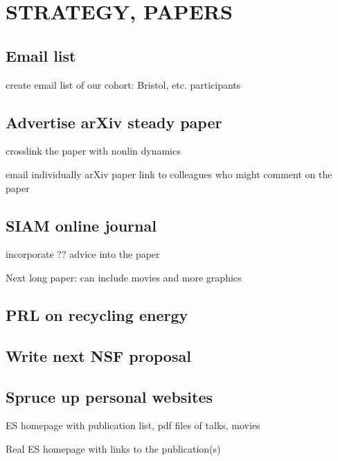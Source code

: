 
\section{STRATEGY, PAPERS}

\subsection{Email list}

create email list of our cohort:  Bristol, etc. participants

\subsection{Advertise arXiv steady paper}

crosslink the paper with nonlin dynamics

email individually arXiv paper link to colleagues who might comment
    on the paper 

\subsection{SIAM online journal}

incorporate ?? advice into the paper

Next long paper: can include movies and more graphics

\subsection{PRL on recycling energy}

\subsection{Write next NSF proposal }

\subsection{Spruce up personal websites}

ES homepage with publication list, pdf files of talks, movies

Real ES homepage with links to the publication(s)

